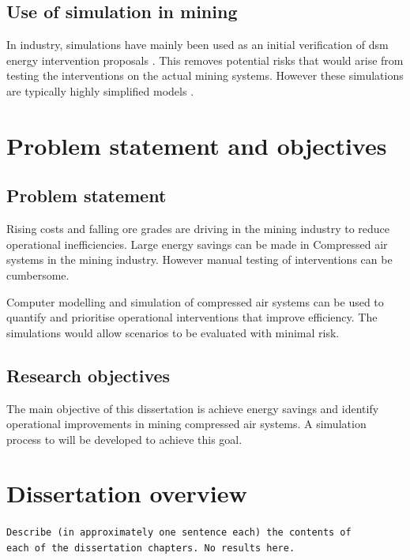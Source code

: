 	\subsection{Use of simulation in mining}
		In industry, simulations have mainly been used as an initial verification of \gls{dsm} energy intervention proposals \cite{Kriel2014Masters}. This removes potential risks that would arise from testing the interventions on the actual mining systems. However these simulations are typically highly simplified models \cite{marais2013simplification}.
		
		
	\section{Problem statement and objectives}
	\subsection{Problem statement}
 		Rising costs and falling ore grades are driving in the mining industry to reduce operational inefficiencies. Large energy savings can be made in Compressed air systems in the mining industry. However manual testing of interventions can be cumbersome.
 		\par
 		Computer modelling and simulation of compressed air systems can be used to quantify and prioritise operational interventions that improve efficiency. The simulations would allow scenarios to be evaluated with minimal risk.
	\subsection{Research objectives}
		The main objective of this dissertation is achieve energy savings and identify operational improvements in mining compressed air systems. A simulation process to will be developed to achieve this goal.
\section{Dissertation overview}
	\texttt{Describe (in approximately one sentence each) the contents of \\each of the dissertation chapters. No results here.}